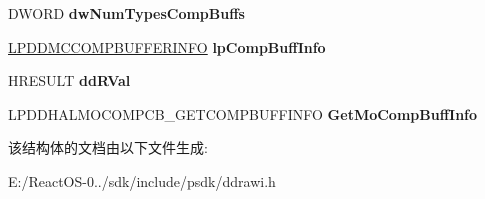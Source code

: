 \begin{DoxyCompactItemize}
D\+W\+O\+RD {\bfseries dw\+Num\+Types\+Comp\+Buffs}
\item 
\mbox{\label{struct___d_d_h_a_l___g_e_t_m_o_c_o_m_p_c_o_m_p_b_u_f_f_d_a_t_a_ad8a63b38a3cbcbfd92e12137f1aa92ab}} 
\hyperlink{struct___d_d_m_c_c_o_m_p_b_u_f_f_e_r_i_n_f_o}{L\+P\+D\+D\+M\+C\+C\+O\+M\+P\+B\+U\+F\+F\+E\+R\+I\+N\+FO} {\bfseries lp\+Comp\+Buff\+Info}
\item 
\mbox{\label{struct___d_d_h_a_l___g_e_t_m_o_c_o_m_p_c_o_m_p_b_u_f_f_d_a_t_a_a7109aa951a8c783a71eaf3c4965d44d9}} 
H\+R\+E\+S\+U\+LT {\bfseries dd\+R\+Val}
\item 
\mbox{\label{struct___d_d_h_a_l___g_e_t_m_o_c_o_m_p_c_o_m_p_b_u_f_f_d_a_t_a_ad0f398766cd5e59296674e8095ff6d9f}} 
L\+P\+D\+D\+H\+A\+L\+M\+O\+C\+O\+M\+P\+C\+B\+\_\+\+G\+E\+T\+C\+O\+M\+P\+B\+U\+F\+F\+I\+N\+FO {\bfseries Get\+Mo\+Comp\+Buff\+Info}
\end{DoxyCompactItemize}


该结构体的文档由以下文件生成\+:\begin{DoxyCompactItemize}
\item 
E\+:/\+React\+O\+S-\/0../sdk/include/psdk/ddrawi.\+h\end{DoxyCompactItemize}
